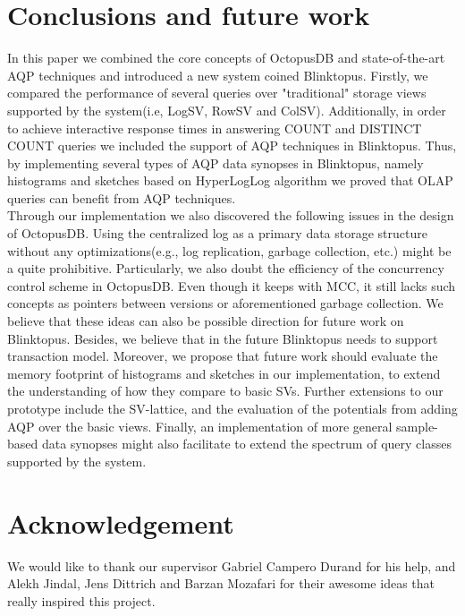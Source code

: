 \documentclass[10pt, conference, compsocconf]{IEEEtran}
\begin{document}
\section{Conclusions and future work}
In this paper we combined the core concepts of OctopusDB and state-of-the-art AQP techniques and introduced a new system coined Blinktopus. Firstly, we compared the performance of several queries over "traditional" storage views supported by the system(i.e, LogSV, RowSV and ColSV). Additionally, in order to achieve interactive response times in answering COUNT and DISTINCT COUNT queries we included the support of AQP techniques in Blinktopus. Thus, by implementing several types of AQP data synopses in Blinktopus, namely histograms and sketches based on HyperLogLog algorithm we proved that OLAP queries can benefit from AQP techniques. \\
Through our implementation we also discovered the following issues in the design of OctopusDB. Using the centralized log as a primary data storage structure without any optimizations(e.g., log replication, garbage collection, etc.) might be a quite prohibitive. Particularly, we also doubt the efficiency of the concurrency control scheme in OctopusDB. Even though it keeps with MCC, it still lacks such concepts as pointers between versions or aforementioned garbage collection. We believe that these ideas can also be possible direction for future work on Blinktopus. Besides, we believe that in the future Blinktopus needs to support transaction model. Moreover, we propose that future work should evaluate the memory footprint of histograms and sketches in our implementation, to extend the understanding of how they compare to basic SVs. Further extensions to our prototype include the SV-lattice, and the evaluation of the potentials from adding AQP over the basic views. Finally, an implementation of more general sample-based data synopses might also facilitate to extend the spectrum of query classes supported by the system.

\section*{Acknowledgement}
We would like to thank our supervisor Gabriel Campero Durand for his help, and Alekh Jindal, Jens Dittrich and Barzan Mozafari for their awesome ideas that really inspired this project.
\end{document}
